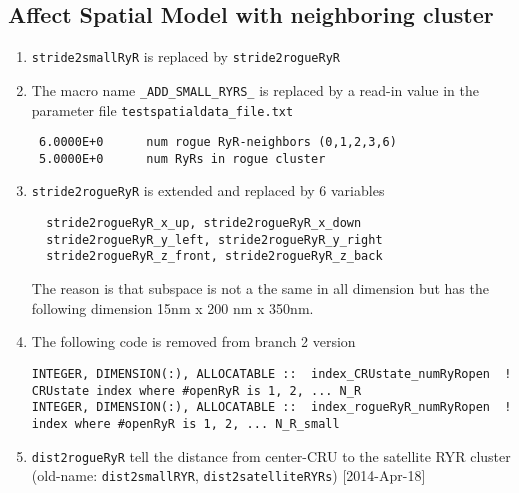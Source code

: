 




\subsection{Affect Spatial Model with neighboring cluster}

\begin{enumerate}
  \item \verb!stride2smallRyR! is replaced by \verb!stride2rogueRyR!
  \item The macro name \verb!_ADD_SMALL_RYRS_! is replaced by a read-in value in
  the parameter file \verb!testspatialdata_file.txt!
  \begin{verbatim}
 6.0000E+0      num rogue RyR-neighbors (0,1,2,3,6)
 5.0000E+0      num RyRs in rogue cluster
  \end{verbatim}
  
  \item \verb!stride2rogueRyR! is extended and replaced by 6 variables
  \begin{verbatim}
  stride2rogueRyR_x_up, stride2rogueRyR_x_down
  stride2rogueRyR_y_left, stride2rogueRyR_y_right
  stride2rogueRyR_z_front, stride2rogueRyR_z_back
  \end{verbatim}
  The reason is that subspace is not a the same in all dimension but has the
  following dimension 15nm x 200 nm x 350nm. 
  
  \item The following code is removed from branch 2 version
  \begin{verbatim}
INTEGER, DIMENSION(:), ALLOCATABLE ::  index_CRUstate_numRyRopen  ! CRUstate index where #openRyR is 1, 2, ... N_R
INTEGER, DIMENSION(:), ALLOCATABLE ::  index_rogueRyR_numRyRopen  ! index where #openRyR is 1, 2, ... N_R_small
  \end{verbatim}
  
  
  \item \verb!dist2rogueRyR! tell the distance from
  center-CRU to the satellite RYR cluster (old-name: \verb!dist2smallRYR!,
  \verb!dist2satelliteRYRs!) [2014-Apr-18]
\end{enumerate}


